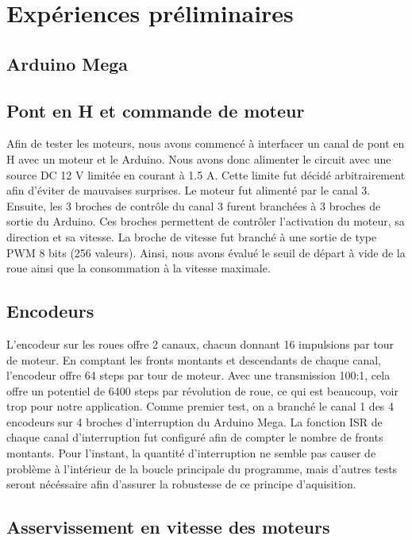 
\chapter{Expériences préliminaires}

\section{Arduino Mega}

\section{Pont en H et commande de moteur}

Afin de tester les moteurs, nous avons commencé à interfacer un canal de pont en H avec un moteur et le Arduino. Nous avons donc alimenter le circuit avec une source DC 12 V limitée en courant à 1.5 A. Cette limite fut décidé arbitrairement afin d'éviter de mauvaises surprises. Le moteur fut alimenté par le canal 3. Ensuite, les 3 broches de contrôle du canal 3 furent branchées à 3 broches de sortie du Arduino. Ces broches permettent de contrôler l'activation du moteur, sa direction et sa vitesse.  La broche de vitesse fut branché à une sortie de type PWM 8 bits (256 valeurs). Ainsi, nous avons évalué le seuil de départ à vide de la roue ainsi que la consommation à la vitesse maximale. 

\section{Encodeurs}

L'encodeur sur les roues offre 2 canaux, chacun donnant 16 impulsions par tour de moteur. En comptant les fronts montants et descendants de chaque canal, l'encodeur offre 64 steps par tour de moteur. Avec une transmission 100:1, cela offre un potentiel de 6400 steps par révolution de roue, ce qui est beaucoup, voir trop pour notre application.  Comme premier test, on a branché le canal 1 des 4 encodeurs sur 4 broches d'interruption du Arduino Mega. La fonction ISR de chaque canal d'interruption fut configuré afin de compter le nombre de fronts montants. Pour l'instant, la quantité d'interruption ne semble pas causer de problème à l'intérieur de la boucle principale du programme, mais d'autres tests seront nécéssaire afin d'assurer la robustesse de ce principe d'aquisition.

\section{Asservissement en vitesse des moteurs}

